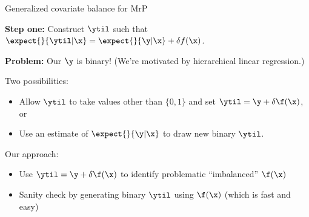 
\begin{frame}[t]{Generalized covariate balance for MrP}

\textbf{Step one:} Construct
$\ytil$ such that $\expect{}{\ytil \vert \x} = \expect{}{\y \vert \x} + \delta f(\x)$.
\pause

\textbf{Problem:} Our $\y$ is binary!  (We're motivated by hierarchical linear regression.)

\pause
Two possibilities:
%
\begin{itemize}
    \item Allow $\ytil$ to take values other than $\{0,1\}$ and set
        $\ytil = \y + \delta \f(\x)$, or
    \item Use an estimate of $\expect{}{\y \vert \x}$ to draw new binary $\ytil$.
\end{itemize}
%
Our approach:
%
\begin{itemize}
    \item Use $\ytil = \y + \delta \f(\x)$ to identify problematic ``imbalanced'' $\f(\x)$
    \item Sanity check by generating binary $\ytil$ using $\f(\x)$ (which is fast and easy)
\end{itemize}


\end{frame}

